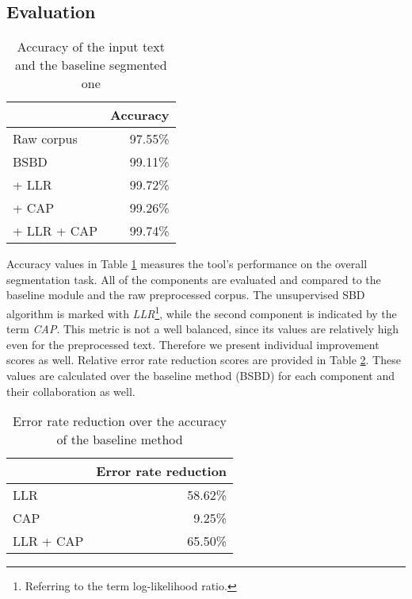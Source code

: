 \subsection{Evaluation}


\begin{table}[h]
\centering
\caption{Accuracy of the input text and the baseline segmented one}
\label{tab:base}
\begin{tabular}{ l  r } 
\hline
& Accuracy \\ 
\hline
Raw corpus  & 97.55\% \\
BSBD & 99.11\% \\
+ LLR & 99.72\% \\
+ CAP & 99.26\% \\
+ LLR + CAP & 99.74\% \\
\hline
\end{tabular}
\end{table}

Accuracy values in Table \ref{tab:base} measures the tool's performance on the overall segmentation task. 
All of the components are evaluated and compared to the baseline module and the raw preprocessed corpus.
The unsupervised SBD algorithm is marked with \emph{LLR}\footnote{Referring to the term log-likelihood ratio.}, while the second component is indicated by the term \emph{CAP}.
This metric is not a well balanced, since its values are relatively high even for the preprocessed text. Therefore we present individual improvement scores as well. 
Relative error rate reduction scores are provided in Table \ref{tab:reduction}. These values are calculated over the baseline method (BSBD) for each component and their collaboration as well. 

\begin{table}[h]
\centering
\caption{Error rate reduction over the accuracy of the baseline method}
\label{tab:reduction}
\begin{tabular}{ l  r } 
\hline
& Error rate reduction\\
\hline
LLR & 58.62\% \\
CAP & 9.25\% \\
LLR + CAP & 65.50\% \\
\hline
\end{tabular}
\end{table}


